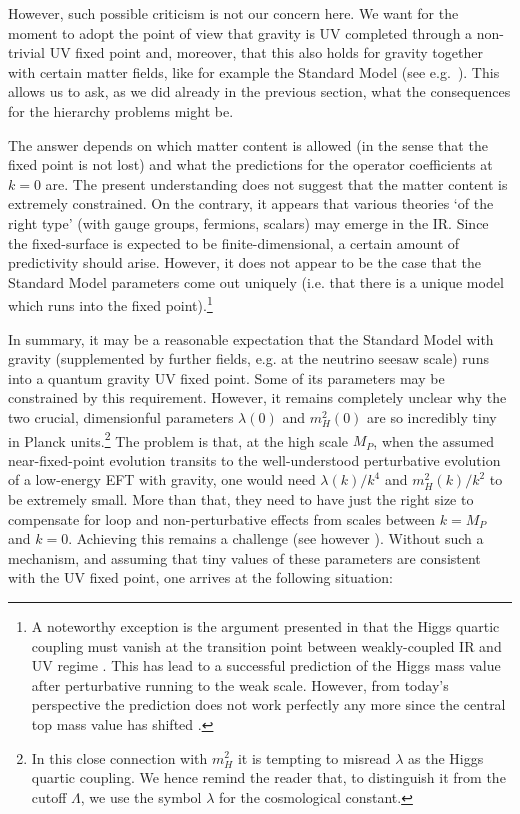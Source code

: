 \documentclass[12pt]{article}
\numberwithin{equation}{section}
\begin{document}
However, such possible criticism is not our concern here. We want for the moment to adopt the point of view that gravity is UV completed through a non-trivial UV fixed point and, moreover, that this also holds for gravity together with certain matter fields, like for example the Standard Model (see e.g.~\cite{Percacci:2003jz, Dona:2013qba, Meibohm:2015twa, Eichhorn:2017egq, Hamada:2017rvn, Christiansen:2017cxa}). This allows us to ask, as we did already in the previous section, what the consequences for the hierarchy problems might be.

The answer depends on which matter content is allowed (in the sense that the fixed point is not lost) and what the predictions for the operator coefficients at $k=0$ are. The present understanding does not suggest that the matter content is extremely constrained. On the contrary, it appears that various theories `of the right type' (with gauge groups, fermions, scalars) may emerge in the IR. Since the fixed-surface is expected to be finite-dimensional, a certain amount of predictivity should arise. However, it does not appear to be the case that the Standard Model parameters come out uniquely (i.e. that there is a unique model which runs into the fixed point).\footnote{A 
noteworthy exception is the argument presented in \cite{Shaposhnikov:2009pv} that the Higgs quartic coupling must vanish at the transition point between weakly-coupled IR and UV regime . This has lead to a successful prediction of the Higgs mass value after perturbative running to the weak scale. However, from today's perspective the prediction does not work perfectly any more since the central top mass value has shifted \cite{Degrassi:2012ry}.}

In summary, it may be a reasonable expectation that the Standard Model with gravity (supplemented by further fields, e.g. at the neutrino seesaw scale) runs into a quantum gravity UV fixed point. Some of its parameters may be constrained by this requirement. However, it remains completely unclear why the two crucial, dimensionful parameters $\lambda(0)$ and $m_H^2(0)$ are so incredibly tiny in Planck units.\footnote{
In 
this close connection with $m_H^2$ it is tempting to misread $\lambda$ as the Higgs quartic coupling. We hence remind the reader that, to distinguish it from the cutoff $\Lambda$, we use the symbol $\lambda$ for the cosmological constant.
} 
The problem is that, at the high scale $M_P$, when the assumed near-fixed-point evolution transits to the well-understood perturbative evolution of a low-energy EFT with gravity, one would need $\lambda(k)/k^4$ and $m_H^2(k)/k^2$ to be extremely small. More than that, they need to have just the right size to compensate for loop and non-perturbative effects from scales between $k=M_P$ and $k=0$. Achieving this remains a challenge (see however \cite{Wetterich:2019qzx}). Without such a mechanism, and assuming that tiny values of these parameters are consistent with the UV fixed point, one arrives at the following situation: 
\end{document}
